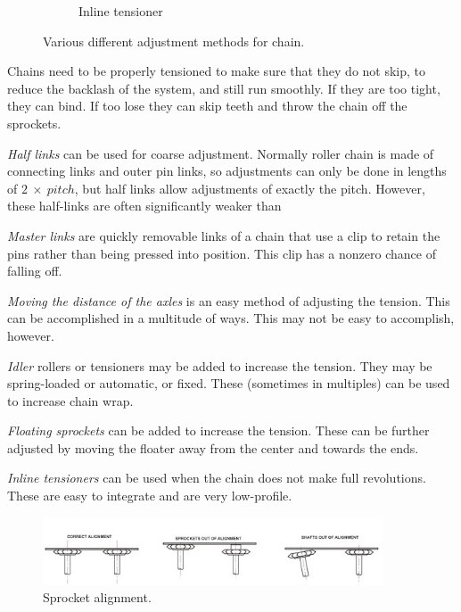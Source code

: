 \documentclass[10pt,letterpaper]{book}
\begin{document}
\begin{figure}[H]
\begin{subfigure}[b]{.32\linewidth}
		\caption{Inline tensioner}
	\end{subfigure}
	
	\caption{Various different adjustment methods for chain.}
\end{figure}

Chains need to be properly tensioned to make sure that they do not skip, to reduce the backlash of the system, and still run smoothly. If they are too tight, they can bind. If too lose they can skip teeth and throw the chain off the sprockets.

\begin{asparaenum}[a)]
	\item \textit{Half links} can be used for coarse adjustment. Normally roller chain is made of connecting links and outer pin links, so adjustments can only be done in lengths of $2 \ \times \ pitch$, but half links allow adjustments of exactly the pitch. However, these half-links are often significantly weaker than 
	\item \textit{Master links} are quickly removable links of a chain that use a clip to retain the pins rather than being pressed into position. This clip has a nonzero chance of falling off.
	\item \textit{Moving the distance of the axles} is an easy method of adjusting the tension. This can be accomplished in a multitude of ways. This may not be easy to accomplish, however.
	\item \textit{Idler} rollers or tensioners may be added to increase the tension. They may be spring-loaded or automatic, or fixed. These (sometimes in multiples) can be used to increase chain wrap.
	\item \textit{Floating sprockets} can be added to increase the tension. These can be further adjusted by moving the floater away from the center and towards the ends.
	\item \textit{Inline tensioners} can be used when the chain does not make full revolutions. These are easy to integrate and are very low-profile.
\end{asparaenum}

\begin{figure}[H]
\includegraphics[width=0.9\textwidth]{imgs/chain_alignment.jpeg}
\caption{Sprocket alignment.}
\end{figure}
\end{document}
